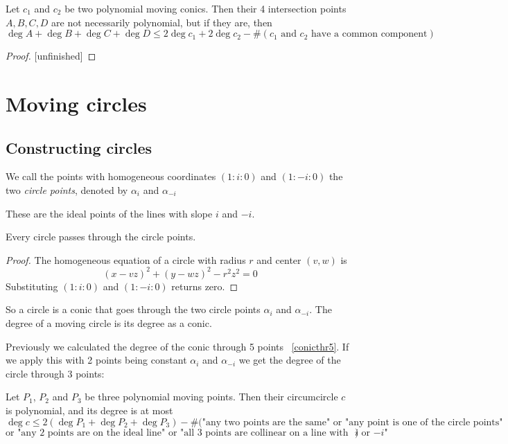 \documentclass[a4paper]{article}
\begin{document}
\begin{theorem}
    Let $c_1$ and $c_2$ be two polynomial moving conics. Then their 4 intersection points $A,B,C,D$ are not necessarily polynomial, but if they are, then
    $$\deg A+\deg B+\deg C+\deg D\le2\deg c_1 + 2\deg c_2-\#(\text{$c_1$ and $c_2$ have a common component})$$
\end{theorem}
\begin{proof}

    [unfinished]
\end{proof}

\section{Moving circles}

\subsection{Constructing circles}

\begin{definition}
    We call the points with homogeneous coordinates $(1:i:0)$ and $(1:-i:0)$ the two \textit{circle points}, denoted by $\alpha_i$ and $\alpha_{-i}$
\end{definition}

These are the ideal points of the lines with slope $i$ and $-i$.

\begin{lemma}
    Every circle passes through the circle points.
\end{lemma}
\begin{proof}
    The homogeneous equation of a circle with radius $r$ and center $(v,w)$ is
    $$(x-vz)^2+(y-wz)^2-r^2z^2=0$$
    Substituting $(1:i:0)$ and $(1:-i:0)$ returns zero.
\end{proof}

So a circle is a conic that goes through the two circle points $\alpha_i$ and $\alpha_{-i}$. The degree of a moving circle is its degree as a conic.

Previously we calculated the degree of the conic through 5 points ~\ref{conicthr5}. If we apply this with 2 points being constant $\alpha_i$ and $\alpha_{-i}$ we get the degree of the circle through 3 points:

\begin{theorem}
    Let $P_1$, $P_2$ and $P_3$ be three polynomial moving points. Then their circumcircle $c$ is polynomial, and its degree is at most
    $$\deg c\le 2(\deg P_1+\deg P_2+\deg P_3)-\#(\text{"any two points are the same" or "any point is one of the circle points"}$$
    $$\text{or "any 2 points are on the ideal line" or "all 3 points are collinear on a line with slope $i$ or $-i$"})$$
\end{theorem}
\end{document}
